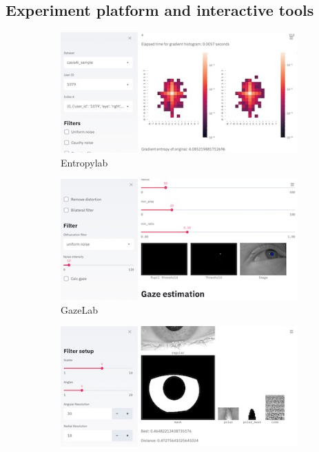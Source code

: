 \subsection{Experiment platform and interactive tools}
\begin{figure}
	\begin{subfigure}{0.3\textwidth}\centering
		\includegraphics[width=1\linewidth]{figures/labs/EntropyLab}
		\caption{Entropylab}\label{fig:tools:entropylab}
	\end{subfigure}
	\hfill
	\begin{subfigure}{0.3\textwidth}\centering
		\includegraphics[width=1\linewidth]{figures/labs/GazeLab}
		\caption{GazeLab}\label{fig:tools:gazelab}
	\end{subfigure}
	\hfill
	\begin{subfigure}{0.3\textwidth}\centering
		\includegraphics[width=1\linewidth]{figures/labs/ObfuscationLab}

\end{subfigure}
\end{figure}
